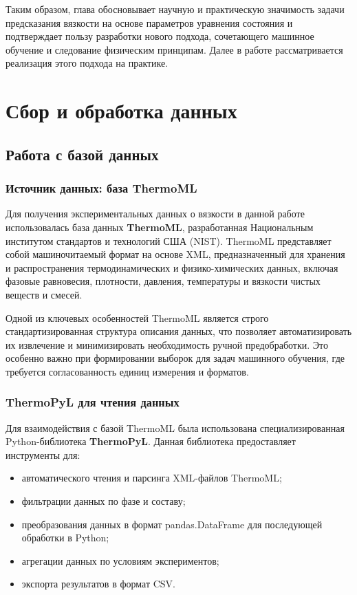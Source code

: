 \documentclass[a4paper,12pt]{article}
\begin{document}
Таким образом, глава обосновывает научную и практическую значимость задачи предсказания вязкости на основе параметров уравнения состояния и подтверждает пользу разработки нового подхода, сочетающего машинное обучение и следование физическим принципам. Далее в работе рассматривается реализация этого подхода на практике.

\newpage

\section{Сбор и обработка данных}
  \subsection{Работа с базой данных}
    \subsubsection{Источник данных: база ThermoML}
    
      Для получения экспериментальных данных о вязкости в данной работе использовалась база данных \textbf{ThermoML}, разработанная Национальным институтом стандартов и технологий США (NIST). ThermoML представляет собой машиночитаемый формат на основе XML, предназначенный для хранения и распространения термодинамических и физико-химических данных, включая фазовые равновесия, плотности, давления, температуры и вязкости чистых веществ и смесей.
      
      Одной из ключевых особенностей ThermoML является строго стандартизированная структура описания данных, что позволяет автоматизировать их извлечение и минимизировать необходимость ручной предобработки. Это особенно важно при формировании выборок для задач машинного обучения, где требуется согласованность единиц измерения и форматов.
      
    \subsubsection{ThermoPyL для чтения данных}
      Для взаимодействия с базой ThermoML была использована специализированная Python-библиотека \textbf{ThermoPyL}. Данная библиотека предоставляет инструменты для:
      \begin{itemize}
        \item автоматического чтения и парсинга XML-файлов ThermoML;
        \item фильтрации данных по фазе и составу;
        \item преобразования данных в формат pandas.DataFrame для последующей обработки в Python;
        \item агрегации данных по условиям экспериментов;
        \item экспорта результатов в формат CSV.
      \end{itemize}
      
\end{document}
